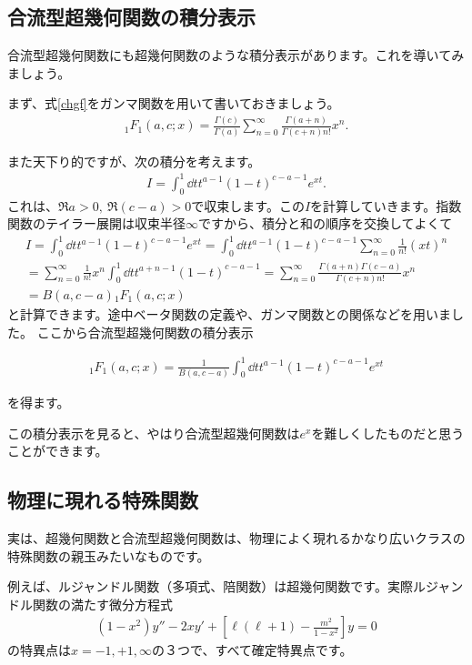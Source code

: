 \documentclass[report,paper=a4, fontsize=12pt, line_length=16cm, number_of_lines=33,dvipdfmx]{jlreq}
\newenvironment{important}{\begin{tcolorbox}[
  colback = white,
  colframe = red!35,
  boxrule = 2mm,
  fonttitle = \bfseries,
  after = \noindent] }{\end{tcolorbox}}
\numberwithin{equation}{section}
\newcommand{\CH}{{}_1F_1}
\begin{document}
\subsection{合流型超幾何関数の積分表示}
合流型超幾何関数にも超幾何関数のような積分表示があります。これを導いてみましょう。

まず、式\eqref{chgf}をガンマ関数を用いて書いておきましょう。
\begin{align}
  \CH(a,c;x)=\frac{\Gamma(c)}{\Gamma(a)}\sum_{n=0}^{\infty}
  \frac{\Gamma(a+n)}{\Gamma(c+n)n!}x^n.
\end{align}

また天下り的ですが、次の積分を考えます。
\begin{align}
  I=\int_{0}^{1}\dd{t}t^{a-1}(1-t)^{c-a-1}e^{xt}.
\end{align}
これは、$\Re a>0,\ \Re(c-a)>0$で収束します。この$I$を計算していきます。指数関数のテイラー展開は収束半径$\infty$ですから、積分と和の順序を交換してよくて
\begin{align}
  I
  =\int_{0}^{1}\dd{t}t^{a-1}(1-t)^{c-a-1}e^{xt}
  =\int_{0}^{1}\dd{t}t^{a-1}(1-t)^{c-a-1}\sum_{n=0}^{\infty}\frac{1}{n!}(xt)^n\nonumber\\
  =\sum_{n=0}^{\infty}\frac{1}{n!} x^n\int_{0}^{1}\dd{t}t^{a+n-1}(1-t)^{c-a-1}
  =\sum_{n=0}^{\infty}\frac{\Gamma(a+n)\Gamma(c-a)}{\Gamma(c+n)n!} x^n\nonumber\\
  =B(a,c-a)\CH(a,c;x)
\end{align}
と計算できます。途中ベータ関数の定義や、ガンマ関数との関係などを用いました。
ここから合流型超幾何関数の積分表示
\begin{important}
  \begin{align}
    \CH(a,c;x)=\frac{1}{B(a,c-a)}\int_{0}^{1}\dd{t}t^{a-1}(1-t)^{c-a-1}e^{xt}
  \end{align}
\end{important}
を得ます。

この積分表示を見ると、やはり合流型超幾何関数は$e^x$を難しくしたものだと思うことができます。

\subsection{物理に現れる特殊関数}
実は、超幾何関数と合流型超幾何関数は、物理によく現れるかなり広いクラスの特殊関数の親玉みたいなものです。

例えば、ルジャンドル関数（多項式、陪関数）は超幾何関数です。実際ルジャンドル関数の満たす微分方程式
\begin{align}
  (1-x^2)y''-2x y'+[\ell(\ell+1)-\frac{m^2}{1-x^2}]y=0
\end{align}
の特異点は$x=-1,+1,\infty$の３つで、すべて確定特異点です。
\end{document}
